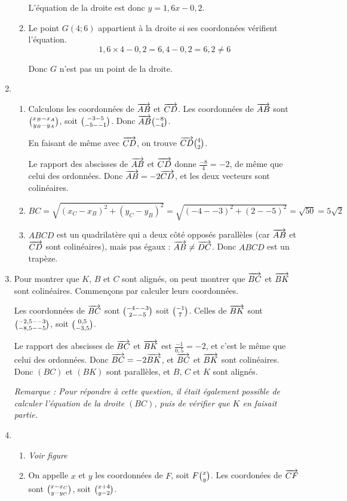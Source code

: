 \documentclass[12pt]{article}
\begin{document}
\begin{exercice}
\begin{enumerate}
\begin{enumerate}
          L'équation de la droite est donc $y=1,6x-0,2$.
        \item Le point $G(4;6)$ appartient à la droite si ses coordonnées vérifient l'équation.
          \[1,6\times4-0,2=6,4-0,2=6,2\neq6\]

          Donc $G$ n'est pas un point de la droite.
      \end{enumerate}
    \item \begin{enumerate}
        \item Calculons les coordonnées de $\overrightarrow{AB}$ et $\overrightarrow{CD}$. Les coordonnées de $\overrightarrow{AB}$ sont $\binom{x_B-x_A}{y_B-y_A}$, soit $\binom{-3-5}{-5--1}$. Donc $\overrightarrow{AB}\binom{-8}{-4}$.

      En faisant de même avec $\overrightarrow{CD}$, on trouve $\overrightarrow{CD}\binom{4}{2}$.

      Le rapport des abscisses de $\overrightarrow{AB}$ et $\overrightarrow{CD}$ donne $\frac{-8}{4}=-2$, de même que celui des ordonnées. Donc $\overrightarrow{AB}=-2\overrightarrow{CD}$, et les deux vecteurs sont colinéaires.
    \item $BC=\sqrt{(x_C-x_B)^2+(y_C-y_B)^2}=\sqrt{(-4--3)^2+(2--5)^2}=\sqrt{50}=5\sqrt{2}$
    \item $ABCD$ est un quadrilatère qui a deux côté opposés parallèles (car
      $\overrightarrow{AB}$ et $\overrightarrow{CD}$ sont colinéaires), mais pas égaux :
      $\overrightarrow{AB}\neq\overrightarrow{DC}$. Donc $ABCD$ est un trapèze.
  \end{enumerate}
\item Pour montrer que $K$, $B$ et $C$ sont alignés, on peut montrer que $\overrightarrow{BC}$ et $\overrightarrow{BK}$ sont colinéaires. Commençons par calculer leurs coordonnées.

  Les coordonnées de $\overrightarrow{BC}$ sont $\binom{-4--3}{2--5}$ soit $\binom{-1}{7}$. Celles de $\overrightarrow{BK}$ sont $\binom{-2,5--3}{-8,5--5}$, soit $\binom{0,5}{-3,5}$.

  Le rapport des abscisses de $\overrightarrow{BC}$ et $\overrightarrow{BK}$ est $\frac{-1}{0,5}=-2$, et c'est le même que celui des ordonnées. Donc $\overrightarrow{BC}=-2\overrightarrow{BK}$, et $\overrightarrow{BC}$ et $\overrightarrow{BK}$ sont colinéaires. Donc $(BC)$ et $(BK)$ sont parallèles, et $B$, $C$ et $K$ sont alignés.

  \emph{Remarque : Pour répondre à cette question, il était également possible de calculer l'équation de la droite $(BC)$, puis de vérifier que $K$ en faisait partie.}
\item 
  \begin{enumerate}
    \item \emph{Voir figure}
    \item On appelle $x$ et $y$ les coordonnées de $F$, soit $F\binom{x}{y}$. Les coordonées de $\overrightarrow{CF}$ sont $\binom{x-x_C}{y-y_C}$, soit $\binom{x+4}{y-2}$.


\end{enumerate}
\end{enumerate}
\end{exercice}
\end{document}
